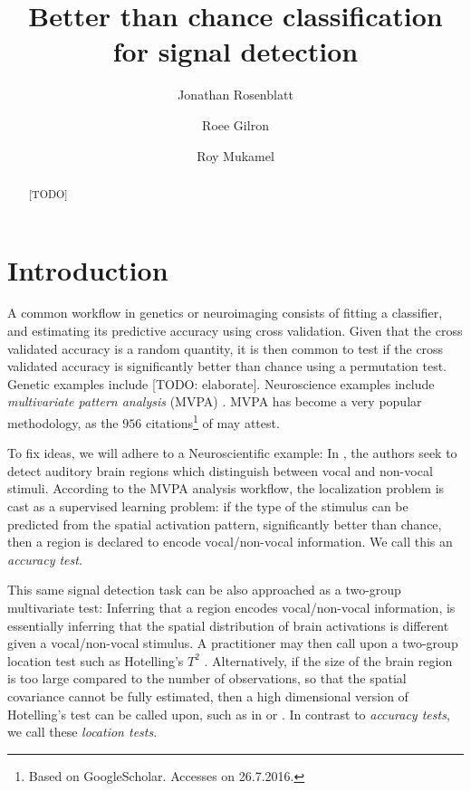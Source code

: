 \documentclass[12pt,a4paper]{article}
\author{Jonathan Rosenblatt \and Roee Gilron \and Roy Mukamel}
\title{Better than chance classification for signal detection}
\begin{document}


\maketitle

\begin{abstract}
[TODO]
\end{abstract}


\section{Introduction}
\label{sec:introduction}






A common workflow in genetics or neuroimaging consists of fitting a classifier, and estimating its predictive accuracy using cross validation. 
Given that the cross validated accuracy is a random quantity, it is then common to test if the cross validated accuracy is significantly better than chance using a permutation test.  
Genetic examples include [TODO: elaborate]\cite{jiang_calculating_2008,radmacher_paradigm_2002-1}.
Neuroscience examples include \emph{multivariate pattern analysis} (MVPA) \cite{kriegeskorte_information-based_2006,varoquaux_assessing_2016,golland_permutation_2003}.
MVPA has become a very popular methodology, as the $956$ citations\footnote{Based on GoogleScholar. Accesses on 26.7.2016.} of \cite{kriegeskorte_information-based_2006} may attest.


To fix ideas, we will adhere to a Neuroscientific example: 
In \cite{gilron_quantifying_2016}, the authors seek to detect auditory brain regions which distinguish between vocal and non-vocal stimuli. 
According to the MVPA analysis workflow, the localization problem is cast as a supervised learning problem: if the type of the stimulus can be predicted from the spatial activation pattern, significantly better than chance, then a region is declared to encode vocal/non-vocal information. 
We call this an \emph{accuracy test}.

This same signal detection task can be also approached as a two-group multivariate test:
Inferring that a region encodes vocal/non-vocal information, is essentially inferring that the spatial distribution of brain activations is different given a vocal/non-vocal stimulus. 
A practitioner may then call upon a two-group location test such as Hotelling's $T^2$ \cite{fujikoshi_multivariate_2011}.
Alternatively, if the size of the brain region is too large compared to the number of observations, so that the spatial covariance cannot be fully estimated, then a high dimensional version of Hotelling's test can be called upon, such as in \cite{srivastava_testing_2013} or \cite{schafer_shrinkage_2005}.
In contrast to \emph{accuracy tests}, we call these \emph{location tests}.
\end{document}

